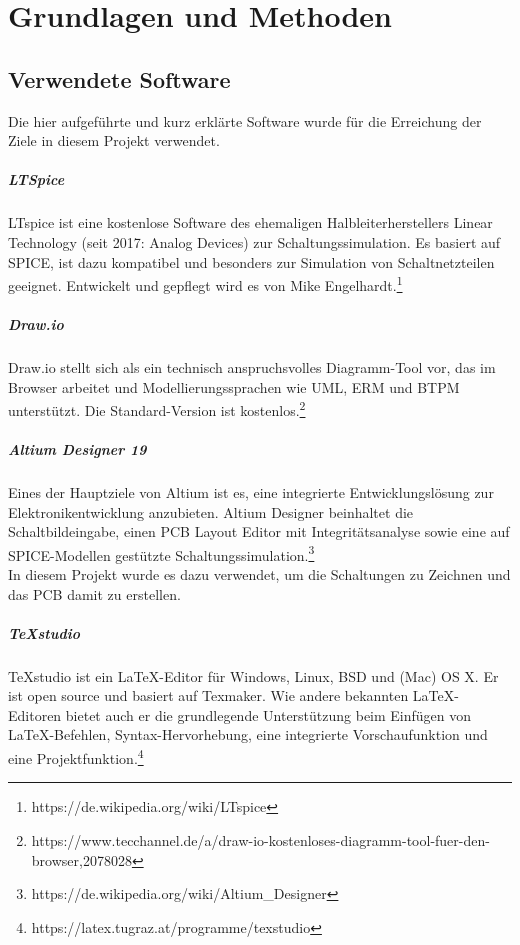 \documentclass[paper=a4, 12pt]{scrreprt}
\begin{document}
\chapter{Grundlagen und Methoden}
	\section{Verwendete Software}
	Die hier aufgeführte und kurz erklärte Software wurde für die Erreichung der Ziele in diesem Projekt verwendet.
	
	\paragraph{LTSpice}\hfill \break
	LTspice ist eine kostenlose Software des ehemaligen Halbleiterherstellers Linear Technology (seit 2017: Analog Devices) zur Schaltungssimulation. Es basiert auf SPICE, ist dazu kompatibel und besonders zur Simulation von Schaltnetzteilen geeignet. Entwickelt und gepflegt wird es von Mike Engelhardt.\footnote{https://de.wikipedia.org/wiki/LTspice}
	\paragraph{Draw.io}\hfill \break
	Draw.io stellt sich als ein technisch anspruchsvolles Diagramm-Tool vor, das im Browser arbeitet und Modellierungssprachen wie UML, ERM und BTPM unterstützt. Die Standard-Version ist kostenlos.\footnote{https://www.tecchannel.de/a/draw-io-kostenloses-diagramm-tool-fuer-den-browser,2078028}
	\paragraph{Altium Designer 19}\hfill \break
	Eines der Hauptziele von Altium ist es, eine integrierte Entwicklungslösung zur Elektronikentwicklung anzubieten.
	Altium Designer beinhaltet die Schaltbildeingabe, einen PCB Layout Editor mit Integritätsanalyse sowie eine auf SPICE-Modellen gestützte Schaltungssimulation.\footnote{https://de.wikipedia.org/wiki/Altium\_Designer}\\
	In diesem Projekt wurde es dazu verwendet, um die Schaltungen zu Zeichnen und das PCB damit zu erstellen.
	\paragraph{TeXstudio}\hfill \break
	TeXstudio ist ein LaTeX-Editor für Windows, Linux, BSD und (Mac) OS X. Er ist open source und basiert auf Texmaker. Wie andere bekannten LaTeX-Editoren bietet auch er die grundlegende Unterstützung beim Einfügen von LaTeX-Befehlen, Syntax-Hervorhebung, eine integrierte Vorschaufunktion und eine Projektfunktion.\footnote{https://latex.tugraz.at/programme/texstudio}
	\newpage
	
\end{document}

